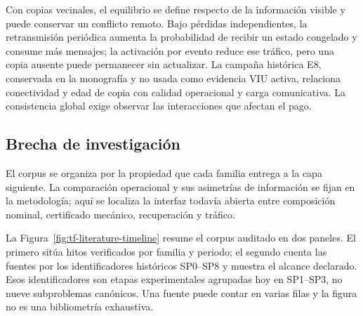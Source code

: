 Con copias vecinales, el equilibrio se define respecto de la información visible y puede conservar un conflicto remoto. Bajo pérdidas independientes, la retransmisión periódica aumenta la probabilidad de recibir un estado congelado y consume más mensajes; la activación por evento reduce ese tráfico, pero una copia ausente puede permanecer sin actualizar. La campaña histórica E8, conservada en la monografía y no usada como evidencia VIU activa, relaciona conectividad y edad de copia con calidad operacional y carga comunicativa. La consistencia global exige observar las interacciones que afectan el pago.

\subsection{Brecha de investigación}
\label{subsec:tf-synthesis-gap}

El corpus se organiza por la propiedad que cada familia entrega a la capa
siguiente. La comparación operacional y sus asimetrías de información se fijan
en la metodología; aquí se localiza la interfaz todavía abierta entre composición
nominal, certificado mecánico, recuperación y tráfico.

La Figura~\ref{fig:tf-literature-timeline} resume el corpus auditado en dos
paneles. El primero sitúa hitos verificados por familia y periodo; el segundo
cuenta las fuentes por los identificadores históricos SP0--SP8 y muestra el
alcance declarado. Esos identificadores son etapas experimentales agrupadas hoy
en SP1--SP3, no nueve subproblemas canónicos. Una fuente puede contar en varias
filas y la figura no es una bibliometría exhaustiva.

\nocite{zlotStentz2006ComplexTasks}

